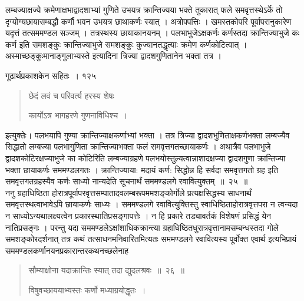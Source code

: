 \documentclass[11pt, openany]{book}
\begin{document}
\begin{sloppypar}
लम्बज्याक्षज्ये क्रमेणाक्षभाद्वादशाभ्यां गुणिते उभयत्र क्रान्तिज्यया भक्ते तुकारात् फले समवृत्तस्थेऽर्के तो दृग्योग्यछायासम्बद्धौ कर्णौ भवन उभयत्र छाथाकर्णः स्यात् । अत्रोपपत्तिः । खमस्तकोपरि पूर्वापरानुकारेण यदृत्तं तत्सममण्डल सञ्जम् । तत्रस्थस्य छायाकानयनम् । पलभाभुजेऽक्षकर्णः कर्णस्तदा क्रान्तिज्याभुजे कः कर्ण इति समशङ्कुः क्रान्तिज्याभुजे समशङ्कुः कुज्यानतद्धृत्याः क्रमेण कर्णकोटित्वात् । अस्माच्छङ्कुःमानाङ्गुलाभ्यस्ते इत्यादिना त्रिज्या द्वादशगुणितानेन भक्ता तत्र ।
\end{sloppypar}



\newpage

\hspace{3cm} गूढार्थप्रकाशकेन सहितः~। \hfill १२५
\vspace{1cm}
\begin{quote}

 {\ssi छेदं लवं च परिवर्त्य हरस्य शेषः
 
कार्योऽत्र भागहरणे गुणनाविधिश्च~।}
\end{quote}

\begin{sloppypar}
 इत्युक्तेः। पलभयापि गुण्या क्रान्तिज्याक्षकर्णाभ्यां भक्ता । तत्र त्रिज्या द्वादशभुणिताक्षकर्णभक्ता लम्बज्यैव सिद्धातो लम्बज्या पलभागुणिता क्रान्तिज्याभक्ता फलं समवृत्तगतच्छायाकर्णः । अथात्रैव पलभाभुजे द्वादशकोटिरक्षज्याभुजे का कोटिरिति लम्बज्याग्रहणे पलभयोस्तुल्यत्वान्नाशादक्षज्या द्वादशगुणा क्रान्तिज्या भक्ता छायाकर्णः सममण्डलगतः । क्रान्तिज्याया: मदायं कर्ण: सिद्धोन्न हि सर्वदा समवृत्तगतो ग्रह इति समवृत्तगतग्रहस्यैव कर्णः साध्यो नान्यदेति सूचनार्थं सममण्डलगे रवावित्युक्तम्~॥~२५~॥\\
 \noindent ननु ग्रहाधिष्ठिता होरात्रपूर्वापरवृत्तसम्पातादवलम्बरूपममशङ्कोर्गोले प्रत्यक्षसिद्धस्य साधनार्थं समवृत्तस्थत्वाभावेऽपि छायाकर्णः साध्यः । सममण्डलगे रवावित्युक्तिस्तु स्वाधिष्ठिताहोरात्रवृत्तपरा न त्वन्यदा न साध्योऽन्यथालक्ष्यत्वेन प्रकारस्थातिप्रसङ्गापत्तेः । न हि प्रकारे तड्यावर्तकं विशेषणं प्रसिद्धं येन नातिप्रसङ्गः । परन्तु यदा सममण्डलेऽक्षांशाधिकक्रान्त्या ग्रहाधिष्ठितधुरात्रवृत्तानामसम्बन्धस्तदा गोले समशङ्कोरदर्शनात् तत्र कथं तत्साधनमनिवारितमित्यतः सममण्डलगे रवावित्यस्य पूर्वोक्त एवार्थ इत्यभिप्रायं सममण्डलकर्णानयनप्रकारान्तरकथनच्छलेनाह\textendash
\end{sloppypar}
\begin{quote}

 {\ssi सौम्याक्षोना यदाक्रान्तिः स्यात् तदा द्युदलश्रवः~॥~२६~॥
 
 विषुवच्छाययाभ्यस्तः कर्णो मध्याग्रयोद्धृतः~।}
\end{quote}
\end{document}
